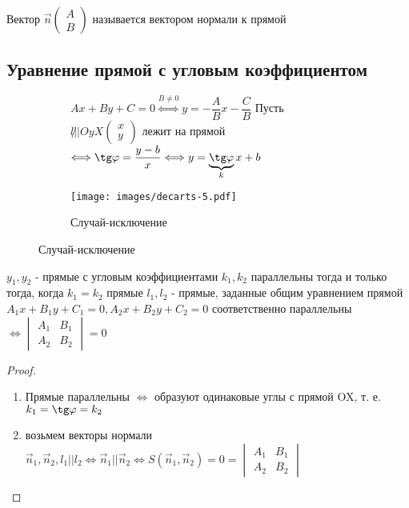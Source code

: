 \begin{definition}
	Вектор \(\vec n \begin{pmatrix}
		A \\ B
	\end{pmatrix}\) называется вектором нормали к прямой
\end{definition}
\subsection{Уравнение прямой с угловым коэффициентом}
\begin{figure}[h]
	\begin{subfigure}[t!]{0.6\linewidth}
		
		\(Ax+By+C = 0 \overset{B\ne0}{\Longleftrightarrow} y = -\dfrac{A}{B}x - \dfrac{C}{B}\) 
		Пусть \(l \not|| Oy X \begin{pmatrix}
			x \\ y
		\end{pmatrix}\) лежит на прямой \(\Longleftrightarrow \tg \phi = \dfrac{y - b}{x}\Longleftrightarrow y = \underbrace{\tg\phi}_{k} x + b\) \newline
	\end{subfigure}
	\begin{subfigure}[b!]{0.4\linewidth}
		\centering
		\texttt{[image: images/decarts-5.pdf]}
		\caption*{Случай-исключение}
		\label{Decart5}
	\end{subfigure}
\end{figure}
\begin{proposition}
	\(y_1, y_2 \) - прямые с угловым коэффициентами \(k_1, k_2\) параллельны тогда и только тогда, когда \(k_1 = k_2\) \newline
	прямые \(l_1, l_2\) - прямые, заданные общим уравнением прямой \(A_1x+B_1y+C_1 = 0, A_2x+B_2y+C_2 = 0\) соответственно параллельны \(\Longleftrightarrow \begin{vmatrix}
		A_1 & B_1 \\ A_2 & B_2
	\end{vmatrix} = 0\)
\end{proposition}
\begin{proof}
	\begin{enumerate}
		\item Прямые параллельны \(\Longleftrightarrow\) образуют одинаковые углы с прямой OX, т. е. \(k_1 = \tg\phi = k_2\)
		\item возьмем векторы нормали \(\vec n_1, \vec n_2, l_1 || l_2 \Longleftrightarrow \vec n_1 || \vec n_2 \Longleftrightarrow S(\vec n_1, \vec n_2) = 0 = \begin{vmatrix}
			A_1 & B_1 \\
			A_2 & B_2
		\end{vmatrix}\)
	\end{enumerate}
\end{proof}
